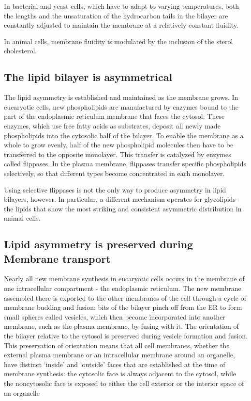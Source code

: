 In bacterial and yeast cells, which have to adapt to varying temperatures,
both the lengths and the unsaturation of the hydrocarbon tails in the
bilayer are constantly adjusted to maintain the membrane at a relatively
constant fluidity.

In animal cells, membrane fluidity is modulated by the inclusion of the
sterol cholesterol.

\subsection{The lipid bilayer is asymmetrical}

The lipid asymmetry is established and maintained as the membrane
grows. In eucaryotic cells, new phospholipids are manufactured by
enzymes bound to the part of the endoplasmic reticulum membrane that
faces the cytosol. These enzymes, which use free fatty acids as substrates,
deposit all newly made phospholipids into the
cytosolic half of the bilayer. To enable the membrane as a whole to grow
evenly, half of the new phospholipid molecules then have to be transferred
to the opposite monolayer. This transfer is catalyzed by enzymes
called flippases. In the plasma membrane, flippases transfer
specific phospholipids selectively, so that different types become concentrated
in each monolayer.

Using selective flippases is not the only way to produce asymmetry in
lipid bilayers, however. In particular, a different mechanism operates for
glycolipids - the lipids that show the most striking and consistent asymmetric
distribution in animal cells.

\subsection{Lipid asymmetry is preserved during Membrane transport}

Nearly all new membrane synthesis in eucaryotic cells occurs in the
membrane of one intracellular compartment - the endoplasmic reticulum.
The new membrane assembled there is exported
to the other membranes of the cell through a cycle of membrane budding
and fusion: bits of the bilayer pinch off from the ER to form small spheres
called vesicles, which then become incorporated into another membrane,
such as the plasma membrane, by fusing with it. The orientation
of the bilayer relative to the cytosol is preserved during vesicle
formation and fusion. This preservation of orientation means that all cell
membranes, whether the external plasma membrane or an intracellular
membrane around an organelle, have distinct ‘inside’ and ‘outside’ faces
that are established at the time of membrane synthesis: the cytosolic face
is always adjacent to the cytosol, while the noncytosolic face is exposed
to either the cell exterior or the interior space of an organelle

